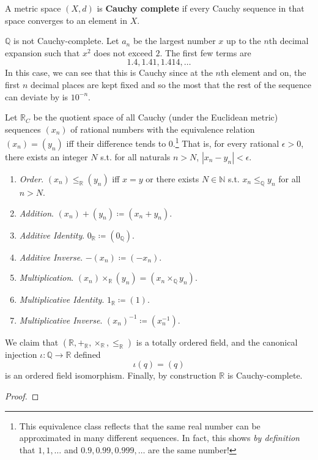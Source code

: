   \begin{definition}
    A metric space $(X, d)$ is \textbf{Cauchy complete} if every Cauchy sequence in that space converges to an element in $X$. 
  \end{definition} 
  
  $\mathbb{Q}$ is not Cauchy-complete. Let $a_n$ be the largest number $x$ up to the $n$th decimal expansion such that $x^2$ does not exceed $2$. The first few terms are 
  \begin{equation}
    1.4, 1.41, 1.414, \ldots
  \end{equation}
  In this case, we can see that this is Cauchy since at the $n$th element and on, the first $n$ decimal places are kept fixed and so the most that the rest of the sequence can deviate by is $10^{-n}$. 

  \begin{definition}
    Let $\mathbb{R}_C$ be the quotient space of all Cauchy (under the Euclidean metric) sequences $(x_n)$ of rational numbers with the equivalence relation $(x_n) = (y_n)$ iff their difference tends to $0$.\footnote{This equivalence class reflects that the same real number can be approximated in many different sequences. In fact, this shows \textit{by definition} that $1, 1, \ldots$ and $0.9, 0.99, 0.999, \ldots$ are the same number!} That is, for every rational $\epsilon > 0$, there exists an integer $N$ s.t. for all naturals $n > N$, $|x_n - y_n| < \epsilon$. 
    \begin{enumerate}
      \item \textit{Order}. $(x_n) \leq_{\mathbb{R}} (y_n)$ iff $x = y$ or there exists $N \in \mathbb{N}$ s.t. $x_n \leq_{\mathbb{Q}} y_n$ for all $n > N$. 
      \item \textit{Addition}. $(x_n) + (y_n) \coloneqq (x_n + y_n)$. 
      \item \textit{Additive Identity}. $0_{\mathbb{R}} \coloneqq (0_{\mathbb{Q}})$. 
      \item \textit{Additive Inverse}. $-(x_n) \coloneqq (-x_n)$. 
      \item \textit{Multiplication}. $(x_n) \times_{\mathbb{R}} (y_n) = (x_n \times_{\mathbb{Q}} y_n)$. 
      \item \textit{Multiplicative Identity}. $1_{\mathbb{R}} \coloneqq (1)$. 
      \item \textit{Multiplicative Inverse}. $(x_n)^{-1} \coloneqq (x_n^{-1})$. 
    \end{enumerate}
    We claim that $(\mathbb{R}, +_{\mathbb{R}}, \times_{\mathbb{R}}, \leq_{\mathbb{R}})$ is a totally ordered field, and the canonical injection $\iota: \mathbb{Q} \rightarrow \mathbb{R}$ defined 
    \begin{equation}
      \iota(q) = (q)
    \end{equation} 
    is an ordered field isomorphism. Finally, by construction $\mathbb{R}$ is Cauchy-complete. 
  \end{definition}
  \begin{proof}
    
  \end{proof}


